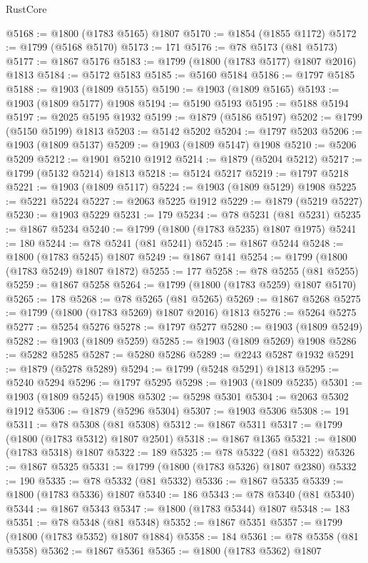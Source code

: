 \begin{lexlean}{RustCore}
\begin{coremodule}
@5168 := @1800 (@1783 @5165) @1807
@5170 := @1854 (@1855 @1172)
@5172 := @1799 (@5168 @5170)
@5173 := 171
@5176 := @78 @5173 (@81 @5173)
@5177 := @1867 @5176
@5183 := @1799 (@1800 (@1783 @5177) @1807 @2016) @1813
@5184 := @5172 @5183
@5185 := @5160 @5184
@5186 := @1797 @5185
@5188 := @1903 (@1809 @5155)
@5190 := @1903 (@1809 @5165)
@5193 := @1903 (@1809 @5177) @1908
@5194 := @5190 @5193
@5195 := @5188 @5194
@5197 := @2025 @5195 @1932
@5199 := @1879 (@5186 @5197)
@5202 := @1799 (@5150 @5199) @1813
@5203 := @5142 @5202
@5204 := @1797 @5203
@5206 := @1903 (@1809 @5137)
@5209 := @1903 (@1809 @5147) @1908
@5210 := @5206 @5209
@5212 := @1901 @5210 @1912
@5214 := @1879 (@5204 @5212)
@5217 := @1799 (@5132 @5214) @1813
@5218 := @5124 @5217
@5219 := @1797 @5218
@5221 := @1903 (@1809 @5117)
@5224 := @1903 (@1809 @5129) @1908
@5225 := @5221 @5224
@5227 := @2063 @5225 @1912
@5229 := @1879 (@5219 @5227)
@5230 := @1903 @5229
@5231 := 179
@5234 := @78 @5231 (@81 @5231)
@5235 := @1867 @5234
@5240 := @1799 (@1800 (@1783 @5235) @1807 @1975)
@5241 := 180
@5244 := @78 @5241 (@81 @5241)
@5245 := @1867 @5244
@5248 := @1800 (@1783 @5245) @1807
@5249 := @1867 @141
@5254 := @1799 (@1800 (@1783 @5249) @1807 @1872)
@5255 := 177
@5258 := @78 @5255 (@81 @5255)
@5259 := @1867 @5258
@5264 := @1799 (@1800 (@1783 @5259) @1807 @5170)
@5265 := 178
@5268 := @78 @5265 (@81 @5265)
@5269 := @1867 @5268
@5275 := @1799 (@1800 (@1783 @5269) @1807 @2016) @1813
@5276 := @5264 @5275
@5277 := @5254 @5276
@5278 := @1797 @5277
@5280 := @1903 (@1809 @5249)
@5282 := @1903 (@1809 @5259)
@5285 := @1903 (@1809 @5269) @1908
@5286 := @5282 @5285
@5287 := @5280 @5286
@5289 := @2243 @5287 @1932
@5291 := @1879 (@5278 @5289)
@5294 := @1799 (@5248 @5291) @1813
@5295 := @5240 @5294
@5296 := @1797 @5295
@5298 := @1903 (@1809 @5235)
@5301 := @1903 (@1809 @5245) @1908
@5302 := @5298 @5301
@5304 := @2063 @5302 @1912
@5306 := @1879 (@5296 @5304)
@5307 := @1903 @5306
@5308 := 191
@5311 := @78 @5308 (@81 @5308)
@5312 := @1867 @5311
@5317 := @1799 (@1800 (@1783 @5312) @1807 @2501)
@5318 := @1867 @1365
@5321 := @1800 (@1783 @5318) @1807
@5322 := 189
@5325 := @78 @5322 (@81 @5322)
@5326 := @1867 @5325
@5331 := @1799 (@1800 (@1783 @5326) @1807 @2380)
@5332 := 190
@5335 := @78 @5332 (@81 @5332)
@5336 := @1867 @5335
@5339 := @1800 (@1783 @5336) @1807
@5340 := 186
@5343 := @78 @5340 (@81 @5340)
@5344 := @1867 @5343
@5347 := @1800 (@1783 @5344) @1807
@5348 := 183
@5351 := @78 @5348 (@81 @5348)
@5352 := @1867 @5351
@5357 := @1799 (@1800 (@1783 @5352) @1807 @1884)
@5358 := 184
@5361 := @78 @5358 (@81 @5358)
@5362 := @1867 @5361
@5365 := @1800 (@1783 @5362) @1807

\end{coremodule}
\end{lexlean}
